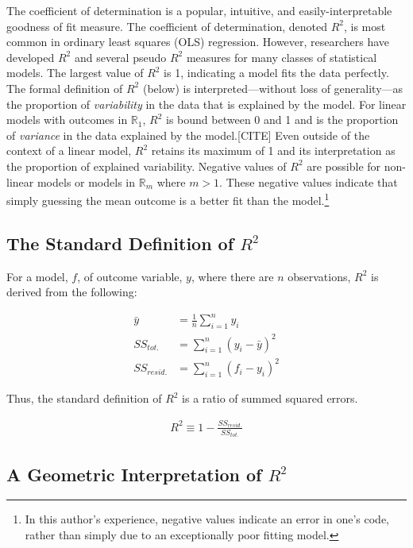 \documentclass[conference,final,]{IEEEtran}
\begin{document}
The coefficient of determination is a popular, intuitive, and
easily-interpretable goodness of fit measure. The coefficient of
determination, denoted \(R^2\), is most common in ordinary least squares
(OLS) regression. However, researchers have developed \(R^2\) and
several pseudo \(R^2\) measures for many classes of statistical models.
The largest value of \(R^2\) is 1, indicating a model fits the data
perfectly. The formal definition of \(R^2\) (below) is
interpreted---without loss of generality---as the proportion of
\emph{variability} in the data that is explained by the model. For
linear models with outcomes in \(\mathbb{R}_1\), \(R^2\) is bound
between 0 and 1 and is the proportion of \emph{variance} in the data
explained by the model.{[}CITE{]} Even outside of the context of a
linear model, \(R^2\) retains its maximum of 1 and its interpretation as
the proportion of explained variability. Negative values of \(R^2\) are
possible for non-linear models or models in \(\mathbb{R}_m\) where
\(m > 1\). These negative values indicate that simply guessing the mean
outcome is a better fit than the model.\footnote{In this author's
  experience, negative values indicate an error in one's code, rather
  than simply due to an exceptionally poor fitting model.}

\hypertarget{the-standard-definition-of-r2}{%
\subsection{\texorpdfstring{The Standard Definition of
\(R^2\)}{The Standard Definition of R\^{}2}}\label{the-standard-definition-of-r2}}

For a model, \(f\), of outcome variable, \(y\), where there are \(n\)
observations, \(R^2\) is derived from the following:

\begin{align}
  \bar{y} &= \frac{1}{n}\sum_{i=1}^{n}y_i\\
  SS_{tot.} &= \sum_{i=1}^n{(y_i-\bar{y})^2}\\
  SS_{resid.} &= \sum_{i=1}^n{(f_i-y_i)^2}
\end{align}

Thus, the standard definition of \(R^2\) is a ratio of summed squared
errors.

\begin{align}
    R^2 \equiv 1 - \frac{SS_{resid.}}{SS_{tot.}}
\end{align}

\hypertarget{a-geometric-interpretation-of-r2}{%
\subsection{\texorpdfstring{A Geometric Interpretation of
\(R^2\)}{A Geometric Interpretation of R\^{}2}}\label{a-geometric-interpretation-of-r2}}
\end{document}
